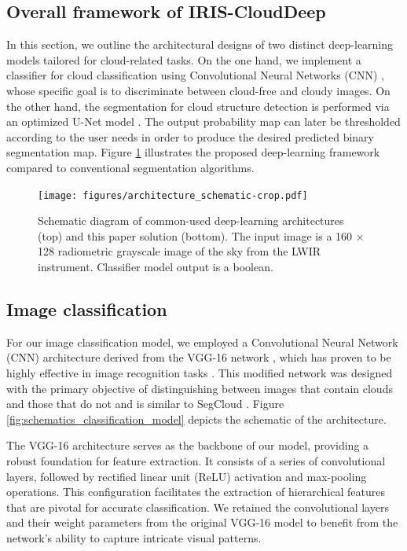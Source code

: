 \documentclass[amt, article]{copernicus}
\begin{document}
\subsection{Overall framework of IRIS-CloudDeep}

In this section, we outline the architectural designs of two distinct deep-learning models tailored for cloud-related tasks. On the one hand, we implement a classifier for cloud classification using Convolutional Neural Networks (CNN) \citep{lecun1995convolutional, Krizhevsky2012}, whose specific goal is to discriminate between cloud-free and cloudy images. On the other hand, the segmentation for cloud structure detection is performed via an optimized U-Net model \citep{UNET}. The output probability map can later be thresholded according to the user needs in order to produce the desired predicted binary segmentation map. Figure \ref{fig:architecture_schematic} illustrates the proposed deep-learning framework compared to conventional segmentation algorithms.

\begin{figure}[t]
	\texttt{[image: figures/architecture\_schematic-crop.pdf]}
	\caption{Schematic diagram of common-used deep-learning architectures (top) and this paper solution (bottom). The input image is a 160 × 128 radiometric grayscale image of the sky from the LWIR instrument. Classifier model output is a boolean.}
    \label{fig:architecture_schematic}
\end{figure}


\subsection{Image classification}

For our image classification model, we employed a Convolutional Neural Network (CNN) architecture derived from the VGG-16 network \citep{simonyan2015deep}, which has proven to be highly effective in image recognition tasks \citep{ canziani2016analysis}. This modified network was designed with the primary objective of distinguishing between images that contain clouds and those that do not and is similar to SegCloud \citep{SegCloud}. Figure \ref{fig:schematics_classification_model} depicts the schematic of the architecture.

The VGG-16 architecture serves as the backbone of our model, providing a robust foundation for feature extraction. It consists of a series of convolutional layers, followed by rectified linear unit (ReLU) activation \citep{agarap2018deep} and max-pooling operations. This configuration facilitates the  extraction of hierarchical features that are pivotal for accurate classification. We retained the convolutional layers and their weight parameters from the original VGG-16 model to benefit from the network's ability to capture intricate visual patterns.
\end{document}
